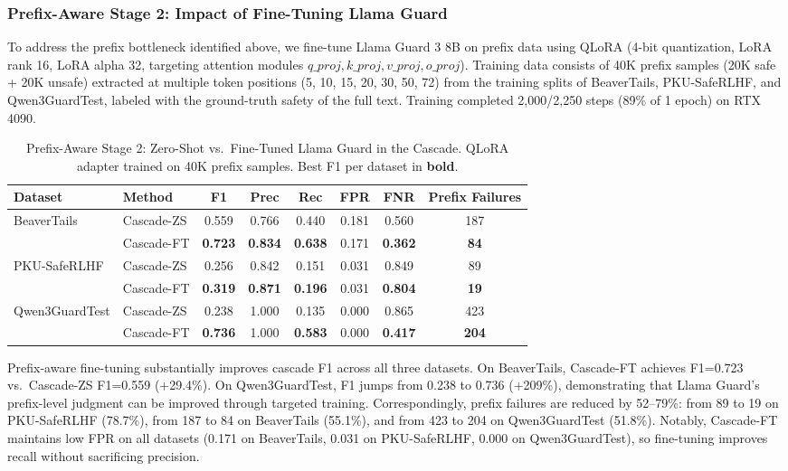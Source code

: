 \documentclass[acmtjournal, acmnowidth]{acmart}
\theoremstyle{definition}
\begin{document}
\subsubsection{Prefix-Aware Stage 2: Impact of Fine-Tuning Llama Guard}
\label{sec:prefix_ft_results}

To address the prefix bottleneck identified above, we fine-tune Llama Guard 3 8B on prefix data using QLoRA (4-bit quantization, LoRA rank 16, LoRA alpha 32, targeting attention modules $q\_proj, k\_proj, v\_proj, o\_proj$). Training data consists of 40K prefix samples (20K safe + 20K unsafe) extracted at multiple token positions (5, 10, 15, 20, 30, 50, 72) from the training splits of BeaverTails, PKU-SafeRLHF, and Qwen3GuardTest, labeled with the ground-truth safety of the full text. Training completed 2,000/2,250 steps (89\% of 1 epoch) on RTX 4090.

\begin{table}[h]
\caption{Prefix-Aware Stage 2: Zero-Shot vs.\ Fine-Tuned Llama Guard in the Cascade. QLoRA adapter trained on 40K prefix samples. Best F1 per dataset in \textbf{bold}.}
\label{tab:prefix_ft}
\small
\begin{tabular}{llcccccc}
\toprule
Dataset & Method & F1 & Prec & Rec & FPR & FNR & Prefix Failures \\
\midrule
\multirow{2}{*}{BeaverTails}
 & Cascade-ZS & 0.559 & 0.766 & 0.440 & 0.181 & 0.560 & 187 \\
 & Cascade-FT & \textbf{0.723} & \textbf{0.834} & \textbf{0.638} & 0.171 & \textbf{0.362} & \textbf{84} \\
\midrule
\multirow{2}{*}{PKU-SafeRLHF}
 & Cascade-ZS & 0.256 & 0.842 & 0.151 & 0.031 & 0.849 & 89 \\
 & Cascade-FT & \textbf{0.319} & \textbf{0.871} & \textbf{0.196} & 0.031 & \textbf{0.804} & \textbf{19} \\
\midrule
\multirow{2}{*}{Qwen3GuardTest}
 & Cascade-ZS & 0.238 & 1.000 & 0.135 & 0.000 & 0.865 & 423 \\
 & Cascade-FT & \textbf{0.736} & 1.000 & \textbf{0.583} & 0.000 & \textbf{0.417} & \textbf{204} \\
\bottomrule
\end{tabular}
\end{table}

Prefix-aware fine-tuning substantially improves cascade F1 across all three datasets. On BeaverTails, Cascade-FT achieves F1=0.723 vs.\ Cascade-ZS F1=0.559 (+29.4\%). On Qwen3GuardTest, F1 jumps from 0.238 to 0.736 (+209\%), demonstrating that Llama Guard's prefix-level judgment can be improved through targeted training. Correspondingly, prefix failures are reduced by 52--79\%: from 89 to 19 on PKU-SafeRLHF (78.7\%), from 187 to 84 on BeaverTails (55.1\%), and from 423 to 204 on Qwen3GuardTest (51.8\%). Notably, Cascade-FT maintains low FPR on all datasets (0.171 on BeaverTails, 0.031 on PKU-SafeRLHF, 0.000 on Qwen3GuardTest), so fine-tuning improves recall without sacrificing precision.
\end{document}
